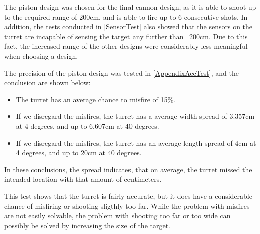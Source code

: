 The piston-design was chosen for the final cannon design, as it is able to
shoot up to the required range of 200cm, and is able to fire up to 6
consecutive shots. In addition, the tests conducted in \autoref{SensorTest} also
showed that the sensors on the turret are incapable of sensing the target any
further than ~200cm. Due to this fact, the increased range of the other
designs were considerably less meaningful when choosing a
design.\nl

The precision of the piston-design was tested in \autoref{AppendixAccTest}, and
the conclusion are shown below:

\begin{itemize}
  \item The turret has an average chance to misfire of 15\%.
  \item If we disregard the misfires, the turret has a average width-spread of
  3.357cm at 4 degrees, and up to 6.607cm at 40 degrees.
  \item If we disregard the misfires, the turret has an average length-spread of
  4cm at 4 degrees, and up to 20cm at 40 degrees.
\end{itemize}

In these conclusions, the spread indicates, that on average, the turret missed
the intended location with that amount of centimeters.\nl

This test shows that the turret is fairly accurate, but it does
have a considerable chance of misfiring or shooting sligthly too far. While the problem
with misfires are not easily solvable, the problem with shooting too far or too
wide can possibly be solved by increasing the size of the target.




